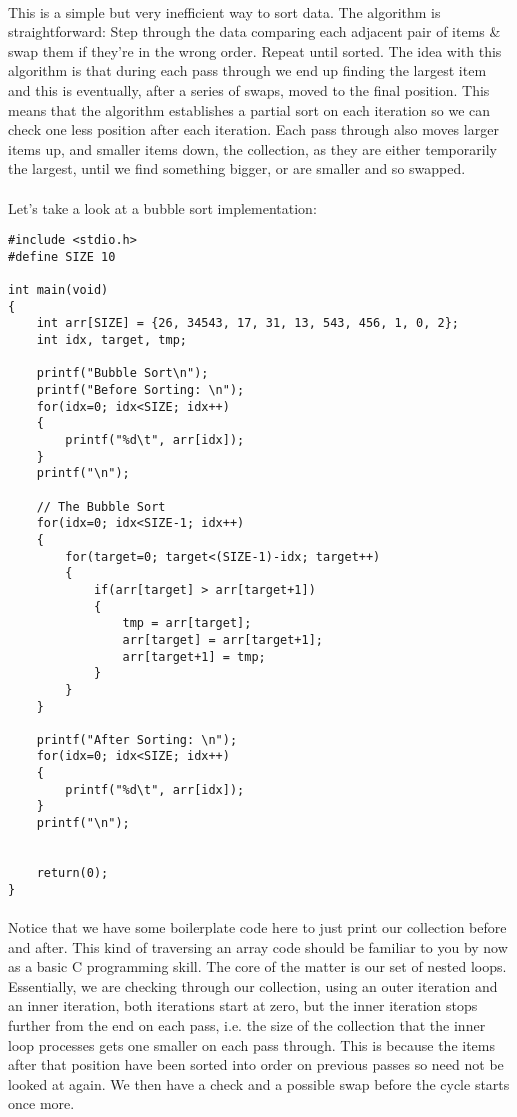 \documentclass[10pt, a4paper, twosize]{article}
\begin{document}
\paragraph{} This is a simple but very inefficient way to sort data. The algorithm is straightforward: Step through the data comparing each adjacent pair of items \& swap them if they're in the wrong order. Repeat until sorted. The idea with this algorithm is that during each pass through we end up finding the largest item and this is eventually, after a series of swaps, moved to the final position. This means that the algorithm establishes a partial sort on each iteration so we can check one less position after each iteration. Each pass through also moves larger items up, and smaller items down, the collection, as they are either temporarily the largest, until we find something bigger, or are smaller and so swapped.

\paragraph{} Let's take a look at a bubble sort implementation:

\begin{lstlisting}
#include <stdio.h>
#define SIZE 10

int main(void)
{
    int arr[SIZE] = {26, 34543, 17, 31, 13, 543, 456, 1, 0, 2};
    int idx, target, tmp;

    printf("Bubble Sort\n");
    printf("Before Sorting: \n");
    for(idx=0; idx<SIZE; idx++)
    {
        printf("%d\t", arr[idx]);
    }
    printf("\n");

    // The Bubble Sort
    for(idx=0; idx<SIZE-1; idx++)
    {
        for(target=0; target<(SIZE-1)-idx; target++)
        {
            if(arr[target] > arr[target+1])
            {
                tmp = arr[target];
                arr[target] = arr[target+1];
                arr[target+1] = tmp;
            }
        }
    }

    printf("After Sorting: \n");
    for(idx=0; idx<SIZE; idx++)
    {
        printf("%d\t", arr[idx]);
    }
    printf("\n");


    return(0);
}
\end{lstlisting}

\paragraph{} Notice that we have some boilerplate code here to just print our collection before and after. This kind of traversing an array code should be familiar to you by now as a basic C programming skill. The core of the matter is our set of nested loops. Essentially, we are checking through our collection, using an outer iteration and an inner iteration, both iterations start at zero, but the inner iteration stops further from the end on each pass, i.e. the size of the collection that the inner loop processes gets one smaller on each pass through. This is because the items after that position have been sorted into order on previous passes so need not be looked at again. We then have a check and a possible swap before the cycle starts once more.
\end{document}
